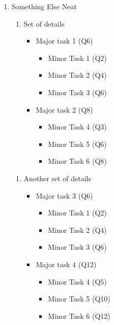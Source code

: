 \begin{enumerate}
    \item Something Else Neat
        \begin{enumerate}
            \item Set of details
                \begin{itemize}
                    \item Major task 1 (Q6)
                        \begin{itemize}
                            \item Minor Task 1 (Q2)
                            \item Minor Task 2 (Q4)
                            \item Minor Task 3 (Q6)
                        \end{itemize}
                    \item Major task 2 (Q8)
                        \begin{itemize}
                            \item Minor Task 4 (Q3)
                            \item Minor Task 5 (Q6)
                            \item Minor Task 6 (Q8)
                        \end{itemize}
                \end{itemize}
        \end{enumerate}
        \begin{enumerate}
            \item Another set of details
                \begin{itemize}
                    \item Major task 3 (Q6)
                        \begin{itemize}
                            \item Minor Task 1 (Q2)
                            \item Minor Task 2 (Q4)
                            \item Minor Task 3 (Q6)
                        \end{itemize}
                    \item Major task 4 (Q12)
                        \begin{itemize}
                            \item Minor Task 4 (Q5)
                            \item Minor Task 5 (Q10)
                            \item Minor Task 6 (Q12)
                        \end{itemize}
                \end{itemize}
        \end{enumerate}

\end{enumerate}

